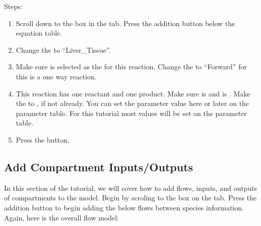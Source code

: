 \documentclass[letterpaper,10pt,english]{sphinxmanual}
\begin{document}
\begin{figure}[htbp]
\centering

\noindent{}
\end{figure}

\sphinxAtStartPar
Steps:
\begin{enumerate}
%
\item {} 
\sphinxAtStartPar
Scroll down to the  box in the  tab. Press
the addition button below the equation table.

\item {} 
\sphinxAtStartPar
Change the  to “Liver\_Tissue”.

\item {} 
\sphinxAtStartPar
Make sure  is selected as the  for this reaction.
Change the  to “Forward” for this is a one way
reaction.

\item {} 
\sphinxAtStartPar
This reaction has one reactant and one product. Make sure  is
 and  is . Make the 
to , if not already. You can set the parameter value here or later
on the parameter table. For this tutorial most values will be set on the
parameter table.

\item {} 
\sphinxAtStartPar
Press the  button.

\end{enumerate}

\begin{figure}[htbp]
\centering

\noindent{}
\end{figure}


\subsection{Add Compartment Inputs/Outputs}
\label{\detokenize{pages/tutorial_mc/addIO:add-compartment-inputs-outputs}}\label{\detokenize{pages/tutorial_mc/addIO::doc}}
\sphinxAtStartPar
In this section of the tutorial, we will cover how to add flows, inputs, and
outputs of compartments to the model. Begin by scroling to the
 box on the  tab. Press the addition button to
begin adding the below flows between species information.
Again, here is the overall flow model:
\end{document}
